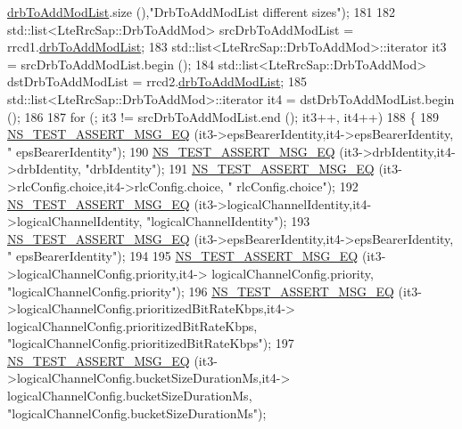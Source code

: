 \begin{DoxyCode}
      \hyperlink{structns3_1_1LteRrcSap_1_1RadioResourceConfigDedicated_ac9201f61eb6cdcc64064f6be6e04cac8}{drbToAddModList}.size (),\textcolor{stringliteral}{"DrbToAddModList different sizes"});
181 
182   std::list<LteRrcSap::DrbToAddMod> srcDrbToAddModList = rrcd1.\hyperlink{structns3_1_1LteRrcSap_1_1RadioResourceConfigDedicated_ac9201f61eb6cdcc64064f6be6e04cac8}{drbToAddModList};
183   std::list<LteRrcSap::DrbToAddMod>::iterator it3 = srcDrbToAddModList.begin ();
184   std::list<LteRrcSap::DrbToAddMod> dstDrbToAddModList = rrcd2.\hyperlink{structns3_1_1LteRrcSap_1_1RadioResourceConfigDedicated_ac9201f61eb6cdcc64064f6be6e04cac8}{drbToAddModList};
185   std::list<LteRrcSap::DrbToAddMod>::iterator it4 = dstDrbToAddModList.begin ();
186 
187   \textcolor{keywordflow}{for} (; it3 != srcDrbToAddModList.end (); it3++, it4++)
188     \{
189       \hyperlink{group__testing_ga2a9d78cffb3db8e867c35fff0b698cf5}{NS\_TEST\_ASSERT\_MSG\_EQ} (it3->epsBearerIdentity,it4->epsBearerIdentity, \textcolor{stringliteral}{"
      epsBearerIdentity"});
190       \hyperlink{group__testing_ga2a9d78cffb3db8e867c35fff0b698cf5}{NS\_TEST\_ASSERT\_MSG\_EQ} (it3->drbIdentity,it4->drbIdentity, \textcolor{stringliteral}{"drbIdentity"});
191       \hyperlink{group__testing_ga2a9d78cffb3db8e867c35fff0b698cf5}{NS\_TEST\_ASSERT\_MSG\_EQ} (it3->rlcConfig.choice,it4->rlcConfig.choice, \textcolor{stringliteral}{"
      rlcConfig.choice"});
192       \hyperlink{group__testing_ga2a9d78cffb3db8e867c35fff0b698cf5}{NS\_TEST\_ASSERT\_MSG\_EQ} (it3->logicalChannelIdentity,it4->logicalChannelIdentity, \textcolor{stringliteral}{
      "logicalChannelIdentity"});
193       \hyperlink{group__testing_ga2a9d78cffb3db8e867c35fff0b698cf5}{NS\_TEST\_ASSERT\_MSG\_EQ} (it3->epsBearerIdentity,it4->epsBearerIdentity, \textcolor{stringliteral}{"
      epsBearerIdentity"});
194 
195       \hyperlink{group__testing_ga2a9d78cffb3db8e867c35fff0b698cf5}{NS\_TEST\_ASSERT\_MSG\_EQ} (it3->logicalChannelConfig.priority,it4->
      logicalChannelConfig.priority, \textcolor{stringliteral}{"logicalChannelConfig.priority"});
196       \hyperlink{group__testing_ga2a9d78cffb3db8e867c35fff0b698cf5}{NS\_TEST\_ASSERT\_MSG\_EQ} (it3->logicalChannelConfig.prioritizedBitRateKbps,it4->
      logicalChannelConfig.prioritizedBitRateKbps, \textcolor{stringliteral}{"logicalChannelConfig.prioritizedBitRateKbps"});
197       \hyperlink{group__testing_ga2a9d78cffb3db8e867c35fff0b698cf5}{NS\_TEST\_ASSERT\_MSG\_EQ} (it3->logicalChannelConfig.bucketSizeDurationMs,it4->
      logicalChannelConfig.bucketSizeDurationMs, \textcolor{stringliteral}{"logicalChannelConfig.bucketSizeDurationMs"});

\end{DoxyCode}

